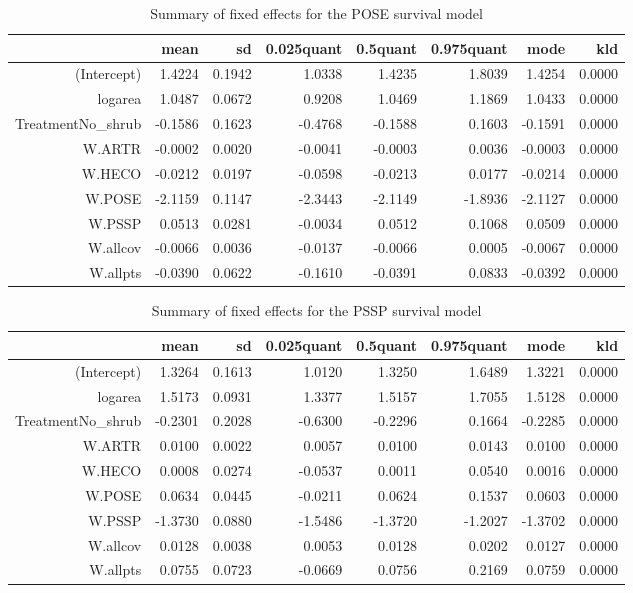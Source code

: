 \begin{table}[ht]
\centering
\caption{Summary of fixed effects for the POSE survival model} 
\label{POSEsurvival}
\begin{tabular}{rrrrrrrr}
  \hline
 & mean & sd & 0.025quant & 0.5quant & 0.975quant & mode & kld \\ 
  \hline
(Intercept) & 1.4224 & 0.1942 & 1.0338 & 1.4235 & 1.8039 & 1.4254 & 0.0000 \\ 
  logarea & 1.0487 & 0.0672 & 0.9208 & 1.0469 & 1.1869 & 1.0433 & 0.0000 \\ 
  TreatmentNo\_shrub & -0.1586 & 0.1623 & -0.4768 & -0.1588 & 0.1603 & -0.1591 & 0.0000 \\ 
  W.ARTR & -0.0002 & 0.0020 & -0.0041 & -0.0003 & 0.0036 & -0.0003 & 0.0000 \\ 
  W.HECO & -0.0212 & 0.0197 & -0.0598 & -0.0213 & 0.0177 & -0.0214 & 0.0000 \\ 
  W.POSE & -2.1159 & 0.1147 & -2.3443 & -2.1149 & -1.8936 & -2.1127 & 0.0000 \\ 
  W.PSSP & 0.0513 & 0.0281 & -0.0034 & 0.0512 & 0.1068 & 0.0509 & 0.0000 \\ 
  W.allcov & -0.0066 & 0.0036 & -0.0137 & -0.0066 & 0.0005 & -0.0067 & 0.0000 \\ 
  W.allpts & -0.0390 & 0.0622 & -0.1610 & -0.0391 & 0.0833 & -0.0392 & 0.0000 \\ 
   \hline
\end{tabular}
\end{table}

\begin{table}[ht]
\centering
\caption{Summary of fixed effects for the PSSP survival model} 
\label{PSSPsurvival}
\begin{tabular}{rrrrrrrr}
  \hline
 & mean & sd & 0.025quant & 0.5quant & 0.975quant & mode & kld \\ 
  \hline
(Intercept) & 1.3264 & 0.1613 & 1.0120 & 1.3250 & 1.6489 & 1.3221 & 0.0000 \\ 
  logarea & 1.5173 & 0.0931 & 1.3377 & 1.5157 & 1.7055 & 1.5128 & 0.0000 \\ 
  TreatmentNo\_shrub & -0.2301 & 0.2028 & -0.6300 & -0.2296 & 0.1664 & -0.2285 & 0.0000 \\ 
  W.ARTR & 0.0100 & 0.0022 & 0.0057 & 0.0100 & 0.0143 & 0.0100 & 0.0000 \\ 
  W.HECO & 0.0008 & 0.0274 & -0.0537 & 0.0011 & 0.0540 & 0.0016 & 0.0000 \\ 
  W.POSE & 0.0634 & 0.0445 & -0.0211 & 0.0624 & 0.1537 & 0.0603 & 0.0000 \\ 
  W.PSSP & -1.3730 & 0.0880 & -1.5486 & -1.3720 & -1.2027 & -1.3702 & 0.0000 \\ 
  W.allcov & 0.0128 & 0.0038 & 0.0053 & 0.0128 & 0.0202 & 0.0127 & 0.0000 \\ 
  W.allpts & 0.0755 & 0.0723 & -0.0669 & 0.0756 & 0.2169 & 0.0759 & 0.0000 \\ 
   \hline
\end{tabular}
\end{table}

